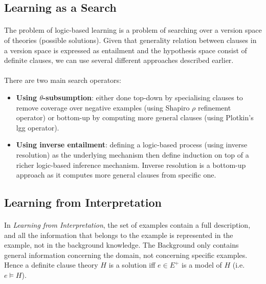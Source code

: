 \documentclass{article}
\theoremstyle{plain}
\theoremstyle{definition}
\begin{document}
\begin{multicols}{2}
\subsection{Learning as a Search}\label{sec:LearningAsASearch}

\paragraph{} The problem of logic-based learning is a problem of searching over a version space of theories (possible solutions). Given that generality relation between clauses in a version space is expressed as entailment and the hypothesis space consist of definite clauses, we can use several different approaches described earlier.

\paragraph{} There are two main search operators:

\begin{itemize}
\item \textbf{Using $\theta$-subsumption}: either done top-down by specialising clauses to remove coverage over negative examples (using Shapiro $\rho$ refinement operator) or bottom-up by computing more general clauses (using Plotkin's lgg operator).
\item \textbf{Using inverse entailment}: defining a logic-based process (using inverse resolution) as the underlying mechanism then define induction on top of a richer logic-based inference mechanism. Inverse resolution is a bottom-up approach as it computes more general clauses from specific one.
\end{itemize}

\subsection{Learning from Interpretation}

\paragraph{} In \textit{Learning from Interpretation}, the set of examples contain a full description, and all the information that belongs to the example is represented in the example, not in the background knowledge. The Background only contains general information concerning the domain, not concerning specific examples. Hence a definite clause theory $H$ is a solution iff $e \in E^+$ is a model of $H$ (i.e. $e \models H$).


\end{multicols}
\end{document}
